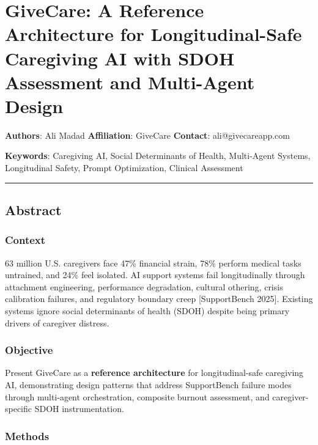 \documentclass[
]{article}
\author{}
\date{}
\begin{document}
\section{GiveCare: A Reference Architecture for Longitudinal-Safe
Caregiving AI with SDOH Assessment and Multi-Agent
Design}\label{givecare-a-reference-architecture-for-longitudinal-safe-caregiving-ai-with-sdoh-assessment-and-multi-agent-design}

\textbf{Authors}: Ali Madad \textbf{Affiliation}: GiveCare
\textbf{Contact}: ali@givecareapp.com

\textbf{Keywords}: Caregiving AI, Social Determinants of Health,
Multi-Agent Systems, Longitudinal Safety, Prompt Optimization, Clinical
Assessment

\begin{center}\rule{0.5\linewidth}{0.5pt}\end{center}

\subsection{Abstract}\label{abstract}

\subsubsection{Context}\label{context}

63 million U.S. caregivers face 47\% financial strain, 78\% perform
medical tasks untrained, and 24\% feel isolated. AI support systems fail
longitudinally through attachment engineering, performance degradation,
cultural othering, crisis calibration failures, and regulatory boundary
creep {[}SupportBench 2025{]}. Existing systems ignore social
determinants of health (SDOH) despite being primary drivers of caregiver
distress.

\subsubsection{Objective}\label{objective}

Present GiveCare as a \textbf{reference architecture} for
longitudinal-safe caregiving AI, demonstrating design patterns that
address SupportBench failure modes through multi-agent orchestration,
composite burnout assessment, and caregiver-specific SDOH
instrumentation.

\subsubsection{Methods}\label{methods}
\end{document}
